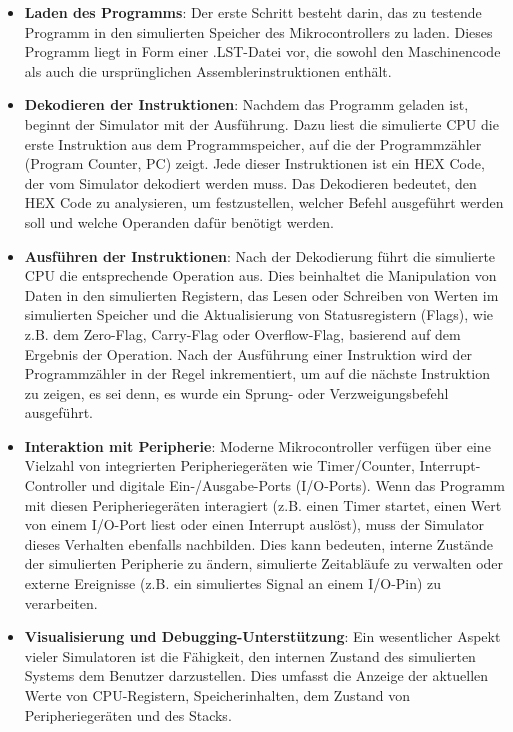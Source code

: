 \begin{itemize}
    \item \textbf{Laden des Programms}: Der erste Schritt besteht darin, das zu testende Programm in den simulierten Speicher des Mikrocontrollers zu laden. Dieses Programm liegt in Form einer .LST-Datei vor, die sowohl den Maschinencode als auch die ursprünglichen Assemblerinstruktionen enthält.
    \item \textbf{Dekodieren der Instruktionen}: Nachdem das Programm geladen ist, beginnt der Simulator mit der Ausführung. Dazu liest die simulierte CPU die erste Instruktion aus dem Programmspeicher, auf die der Programmzähler (Program Counter, PC) zeigt. Jede dieser Instruktionen ist ein HEX Code, der vom Simulator dekodiert werden muss. Das Dekodieren bedeutet, den HEX Code zu analysieren, um festzustellen, welcher Befehl ausgeführt werden soll und welche Operanden dafür benötigt werden.
    \item \textbf{Ausführen der Instruktionen}: Nach der Dekodierung führt die simulierte CPU die entsprechende Operation aus. Dies beinhaltet die Manipulation von Daten in den simulierten Registern, das Lesen oder Schreiben von Werten im simulierten Speicher und die Aktualisierung von Statusregistern (Flags), wie z.B. dem Zero-Flag, Carry-Flag oder Overflow-Flag, basierend auf dem Ergebnis der Operation. Nach der Ausführung einer Instruktion wird der Programmzähler in der Regel inkrementiert, um auf die nächste Instruktion zu zeigen, es sei denn, es wurde ein Sprung- oder Verzweigungsbefehl ausgeführt.
    \item \textbf{Interaktion mit Peripherie}: Moderne Mikrocontroller verfügen über eine Vielzahl von integrierten Peripheriegeräten wie Timer/Counter, Interrupt-Controller und digitale Ein-/Ausgabe-Ports (I/O-Ports). Wenn das Programm mit diesen Peripheriegeräten interagiert (z.B. einen Timer startet, einen Wert von einem I/O-Port liest oder einen Interrupt auslöst), muss der Simulator dieses Verhalten ebenfalls nachbilden. Dies kann bedeuten, interne Zustände der simulierten Peripherie zu ändern, simulierte Zeitabläufe zu verwalten oder externe Ereignisse (z.B. ein simuliertes Signal an einem I/O-Pin) zu verarbeiten.
    \item \textbf{Visualisierung und Debugging-Unterstützung}: Ein wesentlicher Aspekt vieler Simulatoren ist die Fähigkeit, den internen Zustand des simulierten Systems dem Benutzer darzustellen. Dies umfasst die Anzeige der aktuellen Werte von CPU-Registern, Speicherinhalten, dem Zustand von Peripheriegeräten und des Stacks.
\end{itemize}

